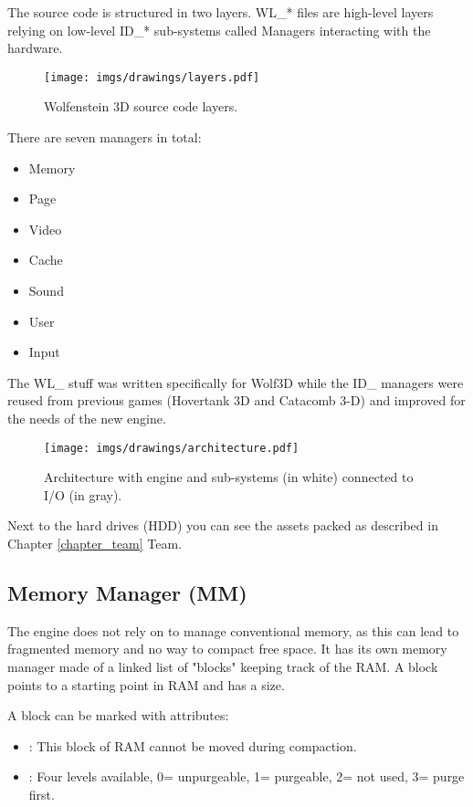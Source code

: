 \documentclass[book.tex]{subfiles}
\begin{document}
The source code is structured in two layers. WL\_* files are high-level layers relying on low-level ID\_* sub-systems called Managers interacting with the hardware.\\
\par
\begin{figure}[H]
\centering
\texttt{[image: imgs/drawings/layers.pdf]} 
\caption{Wolfenstein 3D source code layers.}
 \end{figure}
 \par
There are seven managers in total:\\

\begin{itemize}
	\item Memory
	\item Page
	\item Video
	\item Cache
	\item Sound
	\item User
	\item Input
\end{itemize}
\par
The WL\_ stuff was written specifically for Wolf3D while the ID\_ managers were reused from previous games (Hovertank 3D and Catacomb 3-D) and improved for the needs of the new engine.

\begin{figure}[H]
\centering
\texttt{[image: imgs/drawings/architecture.pdf]}
\caption{Architecture with engine and sub-systems (in white) connected to I/O (in gray).}
\label{fig:architecture}
\end{figure}
Next to the hard drives (HDD) you can see the assets packed as described in Chapter \ref{chapter_team} Team.










\subsection{Memory Manager (MM)}
The engine does not rely on  to manage conventional memory, as this can lead to fragmented memory and no way to compact free space. It has its own memory manager made of a linked list of "blocks" keeping track of the RAM. A block points to a starting point in RAM and has a size.\\
 \par

 \par
A block can be marked with attributes:
\begin{itemize}
\item {} : This block of RAM cannot be moved during compaction.
\item {} : Four levels available, 0= unpurgeable, 1= purgeable, 2= not used, 3= purge first.
\end{itemize}
\end{document}
